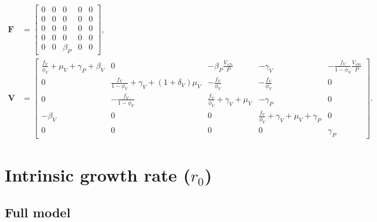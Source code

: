 \documentclass{article}
\newcommand{\mat}[1]{\mathbf{#1}}
\begin{document}
\begin{equation}
  \begin{split}
    \mat{F} &=
    \begin{bmatrix}
      0 & 0 & 0 & 0 & 0 \\
      0 & 0 & 0 & 0 & 0 \\
      0 & 0 & 0 & 0 & 0 \\
      0 & 0 & 0 & 0 & 0 \\
      0 & 0 & \beta_P & 0 & 0
    \end{bmatrix},
    \\
    \mat{V} &=
    \begin{bmatrix}
    \frac{f_V}{\phi_V}
    + \mu_V
    + \gamma_P
    + \beta_V
    &
    0
    &
    - \beta_P \frac{V_{sfs}}{P}
    &
    - \gamma_V
    &
    - \frac{f_V}{1 - \phi_V} \frac{V_{sm}}{P}
    \\
    0
    &
    \frac{f_V}{1 - \phi_V}
    + \gamma_V
    + (1 + \delta_V) \mu_V
    &
    - \frac{f_V}{\phi_V}
    &
    - \frac{f_V}{\phi_V}
    &
    0
    \\
    0
    &
    - \frac{f_V}{1 - \phi_V}
    &
    \frac{f_V}{\phi_V}
    + \gamma_V
    + \mu_V
    &
    - \gamma_P
    &
    0
    \\
    - \beta_V
    &
    0
    &
    0
    &
    \frac{f_V}{\phi_V}
    + \gamma_V
    + \mu_V
    + \gamma_P
    &
    0
    \\
    0
    &
    0
    &
    0
    &
    0
    &
    \gamma_P
    \end{bmatrix}.
  \end{split}
\end{equation}


\section{Intrinsic growth rate ($r_0$)}

\subsection{Full model}
\end{document}
